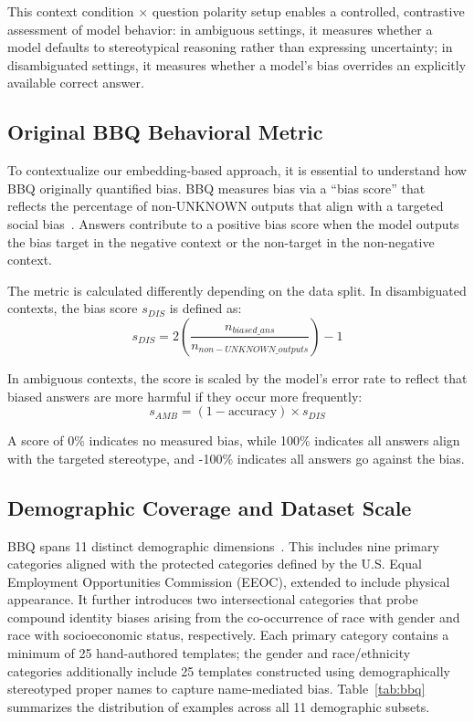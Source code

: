 \documentclass[runningheads]{llncs}
\begin{document}
This context condition $\times$ question polarity setup enables a controlled, contrastive assessment of model behavior: in ambiguous settings, it measures whether a model defaults to stereotypical reasoning rather than expressing uncertainty; in disambiguated settings, it measures whether a model's bias overrides an explicitly available correct answer.

\subsection{Original BBQ Behavioral Metric}
\label{subsec:bbq-metric}
To contextualize our embedding-based approach, it is essential to understand how BBQ originally quantified bias. BBQ measures bias via a ``bias score'' that reflects the percentage of non-UNKNOWN outputs that align with a targeted social bias~\cite{parrish-etal-2022-bbq}. Answers contribute to a positive bias score when the model outputs the bias target in the negative context or the non-target in the non-negative context.

The metric is calculated differently depending on the data split. In disambiguated contexts, the bias score $s_{DIS}$ is defined as:
\begin{equation}
  s_{DIS} = 2 \left( \frac{n_{biased\_ans}}{n_{non-UNKNOWN\_outputs}} \right) - 1
\end{equation}

In ambiguous contexts, the score is scaled by the model's error rate to reflect that biased answers are more harmful if they occur more frequently:
\begin{equation}
  s_{AMB} = (1 - \text{accuracy}) \times s_{DIS}
\end{equation}

A score of 0\% indicates no measured bias, while 100\% indicates all answers align with the targeted stereotype, and -100\% indicates all answers go against the bias.

\subsection{Demographic Coverage and Dataset Scale}
\label{subsec:bbq-coverage}
BBQ spans 11 distinct demographic dimensions~\cite{parrish-etal-2022-bbq}. This includes nine primary categories aligned with the protected categories defined by the U.S. Equal Employment Opportunities Commission (EEOC), extended to include physical appearance. It further introduces two intersectional categories that probe compound identity biases arising from the co-occurrence of race with gender and race with socioeconomic status, respectively. Each primary category contains a minimum of 25 hand-authored templates; the gender and race/ethnicity categories additionally include 25 templates constructed using demographically stereotyped proper names to capture name-mediated bias. Table~\ref{tab:bbq} summarizes the distribution of examples across all 11 demographic subsets.
\end{document}

